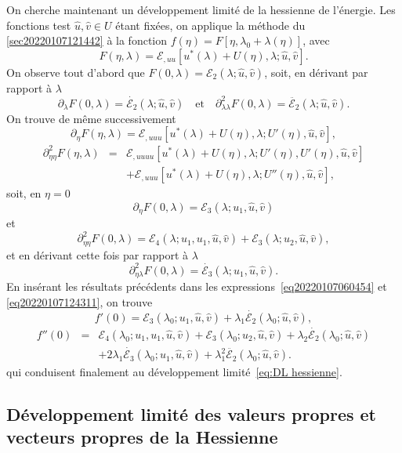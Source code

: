\documentclass{article}
\begin{document}
On cherche maintenant un développement limité de la hessienne de
l'énergie. Les fonctions test $\hat{u}, \hat{v}∈U$ étant
fixées, on applique la méthode du
{\textsection}\ref{sec20220107121442} à la fonction $f (\eta) = F [\eta,
λ_0 + λ (\eta)]$, avec
\[ F (\eta, λ) =\mathcal{E}_{, u  u} [u^{\ast} (λ) + U
   (\eta), λ ; \hat{u}, \hat{v}] . \]
On observe tout d'abord que $F (0, λ) =\mathcal{E}_2 (λ ; \hat{u},
\hat{v})$, soit, en dérivant par rapport à $λ$
\[ \partial_{λ} F (0, λ) = \dot{\mathcal{E}_2} (λ ; \hat{u},
   \hat{v}) \quad \text{et} \quad \partial_{λ  λ}^2 F (0,
   λ) = \ddot{\mathcal{E}_2} (λ ; \hat{u}, \hat{v}) . \]
On trouve de même successivement
\[ \partial_{\eta} F (\eta, λ) =\mathcal{E}_{, u  u  u}
   [u^{\ast} (λ) + U (\eta), λ ; U' (\eta), \hat{u}, \hat{v}], \]
\begin{eqnarray}
  \partial_{\eta  \eta}^2 F (\eta, λ) & = & \mathcal{E}_{, u
   u  u  u} [u^{\ast} (λ) + U (\eta), λ ;
  U' (\eta), U' (\eta), \hat{u}, \hat{v}] \nonumber\\
  &  &  +\mathcal{E}_{, u  u  u} [u^{\ast} (λ)
  + U (\eta), λ ; U'' (\eta), \hat{u}, \hat{v}], \nonumber
\end{eqnarray}
soit, en $\eta = 0$
\[ \partial_{\eta} F (0, λ) =\mathcal{E}_3 (λ ; u_1, \hat{u},
   \hat{v}) \text{} \]
et
\[ \partial_{\eta  \eta}^2 F (0, λ) =\mathcal{E}_4 (λ ;
   u_1, u_1, \hat{u}, \hat{v}) +\mathcal{E}_3 (λ ; u_2, \hat{u},
   \hat{v}), \]
et en dérivant cette fois par rapport à $λ$
\[ \partial_{\eta  λ}^2 F (0, λ) = \dot{\mathcal{E}_3}
   (λ ; u_1, \hat{u}, \hat{v}) . \]
En insérant les résultats précédents dans les
expressions~\eqref{eq20220107060454} et \eqref{eq20220107124311}, on trouve
\[ f' (0) =\mathcal{E}_3 (λ_0 ; u_1, \hat{u}, \hat{v}) + λ_1
   \dot{\mathcal{E}_2} (λ_0 ; \hat{u}, \hat{v}), \]
\begin{eqnarray}
  f'' (0) & = & \mathcal{E}_4 (λ_0 ; u_1, u_1, \hat{u}, \hat{v})
  +\mathcal{E}_3 (λ_0 ; u_2, \hat{u}, \hat{v}) + λ_2
  \dot{\mathcal{E}_2} (λ_0 ; \hat{u}, \hat{v}) \nonumber\\
  &  &   + 2 λ_1  \dot{\mathcal{E}_3} (λ_0 ;
  u_1, \hat{u}, \hat{v}) + λ_1^2  \ddot{\mathcal{E}_2} (λ_0 ;
  \hat{u}, \hat{v}) . \nonumber
\end{eqnarray}
qui conduisent finalement au développement limité~\eqref{eq:DL
hessienne}.

\subsection{Développement limité des valeurs propres et vecteurs
propres de la Hessienne}
\end{document}
